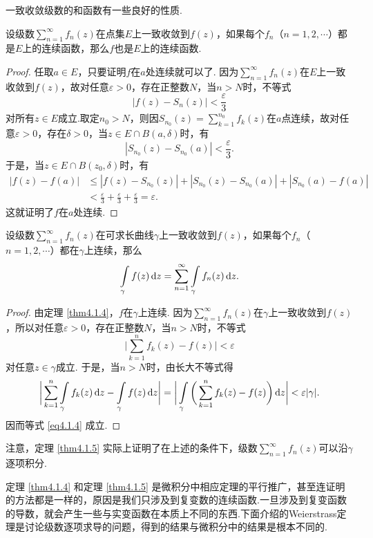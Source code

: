 一致收敛级数的和函数有一些良好的性质.
\begin{theorem}\label{thm4.1.4}
  设级数$\sum_{n=1}^\infty f_n(z)$在点集$E$上一致收敛到$f(z)$，如果每个$f_n$（$n=1,2,\cdots$）都是$E$上的连续函数，那么$f$也是$E$上的连续函数.
\end{theorem}
\begin{proof}
  任取$a\in E$，只要证明$f$在$a$处连续就可以了. 因为$\sum_{n=1}^\infty f_n(z)$在$E$上一致收敛到$f(z)$，故对任意$\varepsilon>0$，存在正整数$N$，当$n>N$时，不等式
  \[
    |f(z) - S_n(z)| < \frac\varepsilon3
  \]
  对所有$z\in E$成立.取定$n_0>N$，则因$S_{n_0}(z)=\sum_{k=1}^{n_0}f_k(z)$在$a$点连续，故对任意$\varepsilon>0$，存在$\delta>0$，当$z\in E\cap B(a,\delta)$时，有
  \[
    |S_{n_0}(z) - S_{n_0}(a)| < \frac\varepsilon3.
  \]
  于是，当$z\in E\cap B(z_0,\delta)$时，有
  \begin{align*}
    |f(z) - f(a)| & \le |f(z) - S_{n_0}(z)| + |S_{n_0}(z) - S_{n_0}(a)| + |S_{n_0}(a) - f(a)|\\
    & < \frac\varepsilon3 + \frac\varepsilon3 + \frac\varepsilon3 = \varepsilon.
  \end{align*}
  这就证明了$f$在$a$处连续.
\end{proof}

\begin{theorem}\label{thm4.1.5}
  设级数$\sum_{n=1}^\infty f_n(z)$在可求长曲线$\gamma$上一致收敛到$f(z)$，如果每个$f_n$（$n=1,2,\cdots$）都在$\gamma$上连续，那么
  \begin{equation}\label{eq4.1.4}
    \int\limits_\gamma f(z)\mathop{}\!\mathrm dz = \sum_{n=1}^\infty\int\limits_\gamma f_n(z) \mathop{}\!\mathrm dz.
  \end{equation}
\end{theorem}
\begin{proof}
  由定理 \ref{thm4.1.4}，$f$在$\gamma$上连续. 因为$\sum_{n=1}^\infty f_n(z)$在$\gamma$上一致收敛到$f(z)$，所以对任意$\varepsilon>0$，存在正整数$N$，当$n>N$时，不等式
  \[
    \bigg| \sum_{k=1}^n f_k(z) - f(z) \bigg| < \varepsilon
  \]
  对任意$z\in\gamma$成立. 于是，当$n>N$时，由长大不等式得
  \[
    \bigg| \sum_{k=1}^n\int\limits_\gamma f_k(z)\mathop{}\!\mathrm dz - \int\limits_\gamma f(z) \mathop{}\!\mathrm dz \bigg|
    = \bigg| \int\limits_\gamma \bigg( \sum_{k=1}^n f_k(z) - f(z) \bigg) \mathop{}\!\mathrm dz \bigg|
    < \varepsilon|\gamma|.
  \]
  因而等式 \eqref{eq4.1.4} 成立.
\end{proof}

注意，定理 \ref{thm4.1.5} 实际上证明了在上述的条件下，级数$\sum_{n=1}^\infty f_n(z)$可以沿$\gamma$逐项积分.

定理 \ref{thm4.1.4} 和定理 \ref{thm4.1.5} 是微积分中相应定理的平行推广，甚至连证明的方法都是一样的，原因是我们只涉及到复变数的连续函数.一旦涉及到复变函数的导数，就会产生一些与实变函数在本质上不同的东西.下面介绍的Weierstrass定理是讨论级数逐项求导的问题，得到的结果与微积分中的结果是根本不同的.

